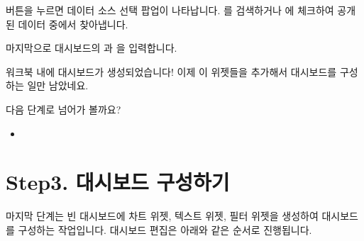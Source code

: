 \documentclass[letterpaper,10pt,english]{sphinxmanual}
\begin{document}
 버튼을 누르면 데이터 소스 선택 팝업이 나타납니다. 를 검색하거나 에 체크하여 공개된 데이터 중에서 찾아냅니다.
\begin{quote}

\begin{figure}[H]
\centering

\noindent{}
\end{figure}
\end{quote}

마지막으로 대시보드의 과 을 입력합니다.
\begin{quote}

\begin{figure}[H]
\centering

\noindent{}
\end{figure}
\end{quote}

워크북 내에 대시보드가 생성되었습니다! 이제 이 위젯들을 추가해서 대시보드를 구성하는 일만 남았네요.
\begin{quote}

\begin{figure}[H]
\centering

\noindent{}
\end{figure}
\end{quote}

다음 단계로 넘어가 볼까요?
\begin{itemize}
\item {} 
{\hyperref[\detokenize{discovery/part00/step3::doc}]{}}

\end{itemize}


\section{Step3. 대시보드 구성하기}
\label{\detokenize{discovery/part00/step3:step3}}\label{\detokenize{discovery/part00/step3::doc}}
마지막 단계는 빈 대시보드에 차트 위젯, 텍스트 위젯, 필터 위젯을 생성하여 대시보드를 구성하는 작업입니다. 대시보드 편집은 아래와 같은 순서로 진행됩니다.
\begin{quote}

\begin{figure}[H]
\centering

\noindent{}
\end{figure}
\end{quote}
\end{document}
